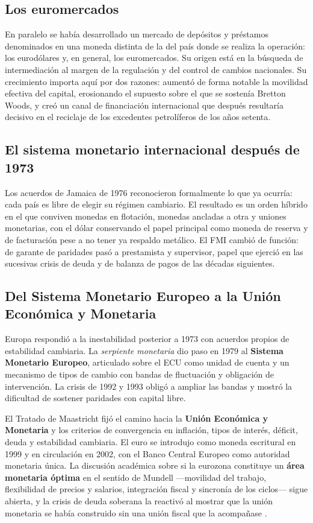 \subsection{Los euromercados}

En paralelo se había desarrollado un mercado de depósitos y préstamos
denominados en una moneda distinta de la del país donde se realiza la operación:
los eurodólares y, en general, los euromercados. Su origen está en la búsqueda
de intermediación al margen de la regulación y del control de cambios
nacionales. Su crecimiento importa aquí por dos razones: aumentó de forma
notable la movilidad efectiva del capital, erosionando el supuesto sobre el que
se sostenía Bretton Woods, y creó un canal de financiación internacional que
después resultaría decisivo en el reciclaje de los excedentes petrolíferos de
los años setenta.

\subsection{El sistema monetario internacional después de 1973}

Los acuerdos de Jamaica de 1976 reconocieron formalmente lo que ya ocurría: cada
país es libre de elegir su régimen cambiario. El resultado es un orden híbrido
en el que conviven monedas en flotación, monedas ancladas a otra y uniones
monetarias, con el dólar conservando el papel principal como moneda de reserva y
de facturación pese a no tener ya respaldo metálico. El FMI cambió de función:
de garante de paridades pasó a prestamista y supervisor, papel que ejerció en
las sucesivas crisis de deuda y de balanza de pagos de las décadas siguientes.

\subsection{Del Sistema Monetario Europeo a la Unión Económica y Monetaria}

Europa respondió a la inestabilidad posterior a 1973 con acuerdos propios de
estabilidad cambiaria. La \emph{serpiente monetaria} dio paso en 1979 al
\textbf{Sistema Monetario Europeo}, articulado sobre el ECU como unidad de
cuenta y un mecanismo de tipos de cambio con bandas de fluctuación y obligación
de intervención. La crisis de 1992 y 1993 obligó a ampliar las bandas y mostró
la dificultad de sostener paridades con capital libre.

El Tratado de Maastricht fijó el camino hacia la \textbf{Unión Económica y
Monetaria} y los criterios de convergencia en inflación, tipos de interés,
déficit, deuda y estabilidad cambiaria. El euro se introdujo como moneda
escritural en 1999 y en circulación en 2002, con el Banco Central Europeo como
autoridad monetaria única. La discusión académica sobre si la eurozona
constituye un \textbf{área monetaria óptima} en el sentido de Mundell —movilidad
del trabajo, flexibilidad de precios y salarios, integración fiscal y
sincronía de los ciclos— sigue abierta, y la crisis de deuda soberana la
reactivó al mostrar que la unión monetaria se había construido sin una unión
fiscal que la acompañase \parencite{cuenca2019}.

